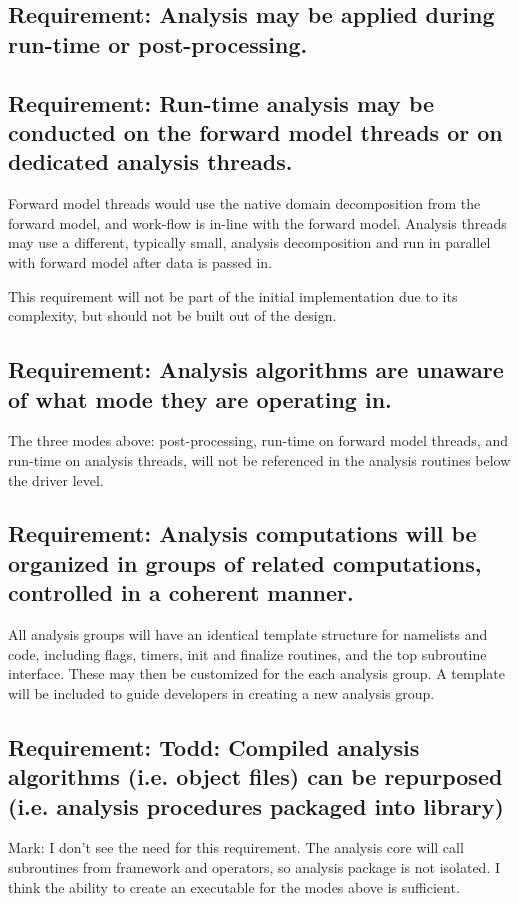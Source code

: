 \documentclass[11pt]{report}
\begin{document}
\subsection{{\color{green} Requirement:} Analysis may be applied during run-time or post-processing.}

\subsection{{\color{green} Requirement:} Run-time analysis may be conducted on the forward model threads or on dedicated analysis threads.}
Forward model threads would use the native domain decomposition from the forward model, and work-flow is in-line with the forward model.  Analysis threads may use a different, typically small, analysis decomposition and run in parallel with forward model after data is passed in.

This requirement will not be part of the initial implementation due to its complexity, but should not be built out of the design.

\subsection{{\color{green} Requirement:} Analysis algorithms are unaware of what mode they are operating in.}
The three modes above: post-processing, run-time on forward model threads, and run-time on analysis threads, will not be referenced in the analysis routines below the driver level.

\subsection{{\color{green} Requirement:} Analysis computations will be organized in groups of related computations, controlled in a coherent manner.}
All analysis groups will have an identical template structure for namelists and code, including flags, timers, init and finalize routines, and the top subroutine interface.  These may then be customized for the each analysis group.   A template will be included to guide developers in creating a new analysis group.

\subsection{{\color{red} Requirement:} Todd: Compiled analysis algorithms (i.e. object files) can be repurposed (i.e. analysis procedures packaged into library)}
Mark: I don't see the need for this requirement.  The analysis core will call subroutines from framework and operators, so analysis package is not isolated.  I think the ability to create an executable for the modes above is sufficient.
\end{document}
